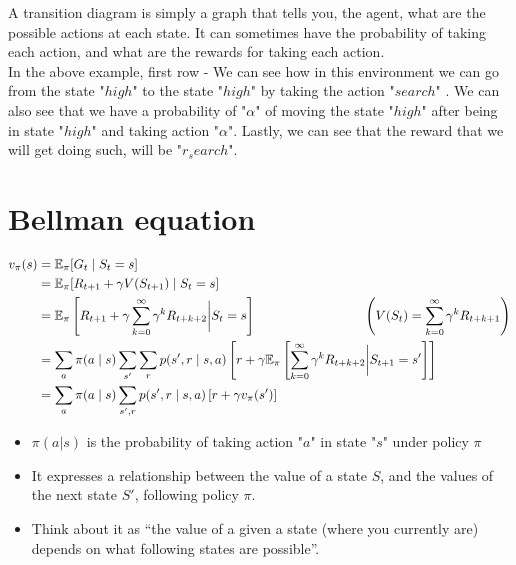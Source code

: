 A transition diagram is simply a graph that tells you, the agent, what are the possible actions at each state. It can sometimes have the probability of taking each action, and what are the rewards for taking each action.\\
In the above example, first row - We can see how in this environment we can go from the state "$high$" to the state "$high$" by taking the action "$search$" . We can also see that we have a probability of "$\alpha$" of moving the state "$high$" after being in state "$high$" and taking action "$\alpha$". Lastly, we can see that the reward that we will get doing such, will be "$r_search$".


\section{Bellman equation \cite{medium-introduction-to-reinforcement-learning-rl-part-3-finite-markov-decision-processes-51e1f8d3ddb7}}
\begin{align}
v_\pi(s) \notag &= \mathbb{E}_\pi [G_t \mid S_t = s] \\ \notag
    &= \mathbb{E}_\pi [R_{t+1} + \gamma V(S_{t+1}) \mid S_t = s] \\ \notag
    &= \mathbb{E}_\pi \left[ R_{t+1} + \gamma \sum_{k=0}^{\infty} \gamma^k R_{t+k+2} \bigg| S_t = s \right] \hspace{3cm} \left(V(S_{t}) = \sum_{k=0}^{\infty} \gamma^k R_{t+k+1} \right) \\ \notag
    &= \sum_a \pi(a \mid s) \sum_{s'} \sum_r p(s', r \mid s, a) \left[ r + \gamma \mathbb{E}_\pi \left[ \sum_{k=0}^{\infty} \gamma^k R_{t+k+2} \bigg| S_{t+1} = s' \right] \right] \\ \notag
    &= \sum_a \pi(a \mid s) \sum_{s', r} p(s', r \mid s, a) \left[ r + \gamma v_\pi(s') \right] \notag
\end{align}

\begin{itemize}
    \item $\pi(a|s)$ is the probability of taking action "$a$" in state "$s$" under policy $\pi$
    \item It expresses a relationship between the value of a state $S$, and the values of the next state $S'$, following policy $\pi$.
    \item Think about it as “the value of a given a state (where you currently are) depends on what following states are possible”.
\end{itemize}

